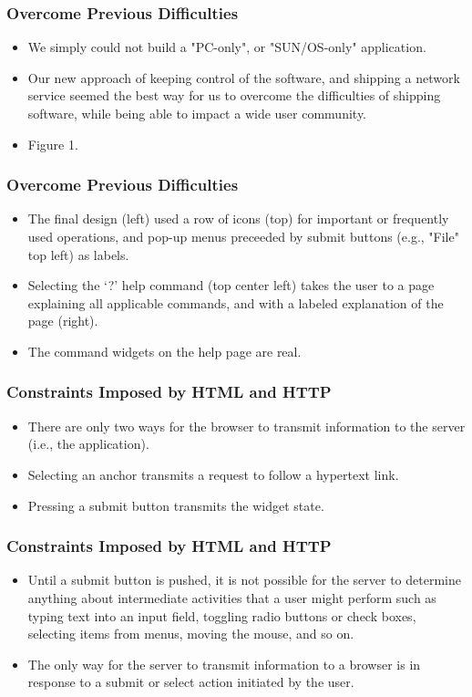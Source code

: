 \documentclass{beamer}
\begin{document}
\begin{frame}
\frametitle{Overcome Previous Difficulties}

\begin{itemize}
\item We simply could not build a "PC-only", or "SUN/OS-only" application.
\item Our new approach of keeping control of the software, and shipping a network service seemed the best way for us to overcome the difficulties of shipping software, while being able to impact a wide user community.
\item Figure 1.
\end{itemize}

\end{frame}

\begin{frame}
\frametitle{Overcome Previous Difficulties}

\begin{itemize}
\item The final design (left) used a row of icons (top) for important or frequently used operations, and pop-up menus preceeded by submit buttons (e.g., "File" top left) as labels.
\item Selecting the `?' help command (top center left) takes the user to a page explaining all applicable commands, and with a labeled explanation of the page (right).
\item The command widgets on the help page are real.
\end{itemize}

\end{frame}

\begin{frame}
\frametitle{Constraints Imposed by HTML and HTTP}

\begin{itemize}
\item There are only two ways for the browser to transmit information to the server (i.e., the application).
\item Selecting an anchor transmits a request to follow a hypertext link.
\item Pressing a submit button transmits the widget state.
\end{itemize}

\end{frame}

\begin{frame}
\frametitle{Constraints Imposed by HTML and HTTP}

\begin{itemize}
\item Until a submit button is pushed, it is not possible for the server to determine anything about intermediate activities that a user might perform such as typing text into an input field, toggling radio buttons or check boxes, selecting items from menus, moving the mouse, and so on.
\item The only way for the server to transmit information to a browser is in response to a submit or select action initiated by the user.
\end{itemize}

\end{frame}
\end{document}
